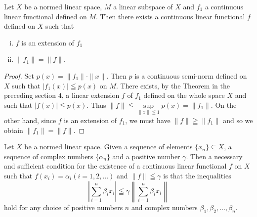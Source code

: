 \label{sec:IV.5}

\begin{theorem}\label{thm:IV.5.Theorem.1} Let $X$ be a normed linear space, $M$ a linear subspace of $X$ and $f_{1}$ a continuous linear functional defined on $M$. Then there exists a continuous linear functional $f$ defined on $X$ such that \begin{enumerate}[i)]
\item $f$ is an extension of $f_{1}$
\item $\|f_{1}\| = \|f\|$.
\end{enumerate}
\end{theorem}

\begin{proof}
 Set $p(x) = \|f_1\| \cdot \|x\|$. Then $p$ is a continuous semi-norm defined on $X$ such that $|f_1(x)| \leqq p(x)$ on $M$. There exists, by the Theorem in the preceding section $4$, a linear extension $f$ of $f_1$ defined on the whole space $X$ and such that $|f(x)| \leqq p(x)$. Thus $\|f\| \leqq \sup\limits_{\|x\| \leqq 1} p(x) = \|f_1\|$. On the other hand, since $f$ is an extension of $f_1$, we must have $\|f\| \geqq \|f_1\|$ and so we obtain $\|f_1\| = \|f\|$. 
\end{proof}


\begin{theorem}\label{thm:IV.5.Theorem.2} Let $X$ be a normed linear space. Given a sequence of elements $\{x_{n}\} \subseteq X$, a sequence of complex numbers $\{\alpha_{n}\}$ and a positive number $\gamma$. Then a necessary and sufficient condition for the existence of a continuous linear functional $f$ on $X$ such that $f(x_{i}) = \alpha_{i} (i = 1, 2, \ldots)$ and $\|f\| \leqq \gamma$ is that the inequalities 
\[
\left| \sum\limits_{i=1} ^{n} \beta_{i} x _{i} \right| \leqq \gamma \left\| \sum\limits_{i=1} ^{n} \beta_{i} x _{i} \right\|
\]
hold for any choice of positive numbers $n$ and complex numbers $\beta_1, \beta_2, \ldots, \beta_n$. 
\end{theorem}

